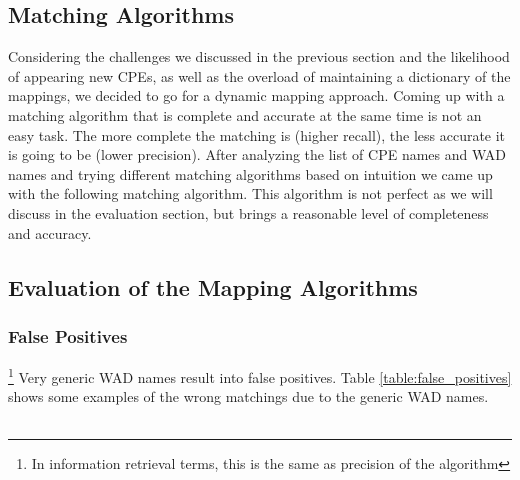 {{\subsection{Matching Algorithms}


Considering the challenges we discussed in the previous section and the likelihood of appearing new CPEs, as well as the overload of maintaining a dictionary of the mappings, we decided to go for a dynamic mapping approach. 
Coming up with a matching algorithm that is complete and accurate at the same time is not an easy task. The more complete the matching is (higher recall), the less accurate it is going to be (lower precision). After analyzing the list of CPE names and WAD names and trying different matching algorithms based on intuition we came up with the following matching algorithm. This algorithm is not perfect as we will discuss in the evaluation section, but brings a reasonable level of completeness and accuracy. 


 
\subsection{Evaluation of the Mapping Algorithms}

\subsubsection{False Positives}\footnote{In information retrieval terms, this is the same as precision of the algorithm}
Very generic WAD names result into false positives. Table \ref{table:false_positives} shows some examples of the wrong matchings due to the generic WAD names. 
\begin{table}
\begin{center}
    \begin{tabular}{ | c | c | }
    

\end{tabular}
\end{center}
\end{table}}}
